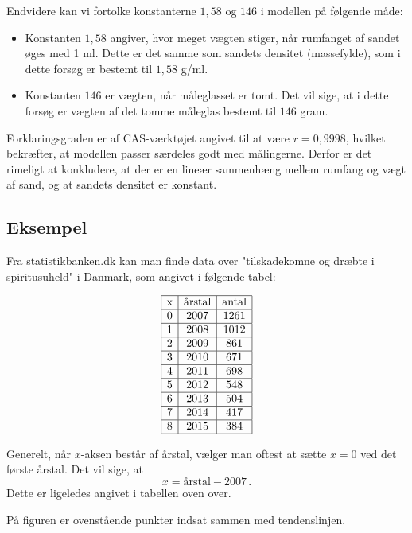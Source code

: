 \documentclass[12pt,oneside,a4paper]{article}
\begin{document}
Endvidere kan vi fortolke konstanterne $1,58$ og $146$ i modellen på følgende måde:
\begin{itemize}
    \item Konstanten $1,58$ angiver, hvor meget vægten stiger, når rumfanget af
        sandet øges med 1 ml. Dette er det samme som sandets densitet
        (massefylde), som i dette forsøg er bestemt til $1,58$ g/ml.
    \item Konstanten $146$ er vægten, når måleglasset er tomt. Det vil sige, at
        i dette forsøg er vægten af det tomme måleglas bestemt til $146$ gram.
\end{itemize}

Forklaringsgraden er af CAS-værktøjet angivet til at være $r=0,9998$, hvilket bekræfter, at modellen
passer særdeles godt med målingerne. Derfor er det rimeligt at konkludere, at der er en 
lineær sammenhæng mellem rumfang og vægt af sand, og at sandets densitet er konstant.

\subsection{Eksempel}
Fra statistikbanken.dk kan man finde data over "tilskadekomne og dræbte i spiritusuheld" i Danmark, som
angivet i følgende tabel:

\[
\begin{array}{|c|c|c|}
    \hline
    $x$ & \mbox{årstal} & \mbox{antal} \\
    \hline
    0 & 2007 & 1261 \\
    \hline
    1 & 2008 & 1012 \\
    \hline
    2 & 2009 & 861 \\
    \hline
    3 & 2010 & 671 \\
    \hline
    4 & 2011 & 698 \\
    \hline
    5 & 2012 & 548 \\
    \hline
    6 & 2013 & 504 \\
    \hline
    7 & 2014 & 417 \\
    \hline
    8 & 2015 & 384 \\
    \hline
\end{array}
\]

Generelt, når $x$-aksen består af årstal, vælger man oftest at sætte $x=0$ ved
det første årstal.  Det vil sige, at
\[
    x = \mbox{årstal} - 2007\,.
\]
Dette er ligeledes angivet i tabellen oven over.

På figuren er ovenstående punkter indsat sammen med tendenslinjen.
\end{document}
